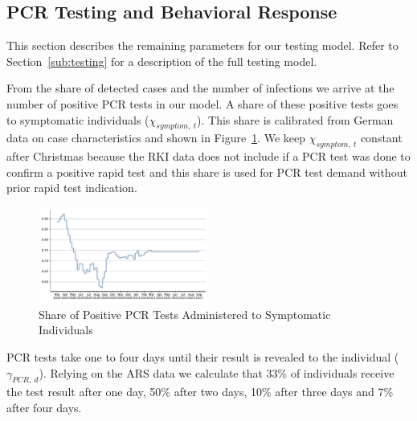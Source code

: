 \subsection{PCR Testing and Behavioral Response}
\label{subsec:pcr_testing_and_behavioral_response}


This section describes the remaining parameters for our testing model. Refer to
Section~\ref{sub:testing} for a description of the full testing model.

From the share of detected cases and the number of infections we arrive at the number of
positive PCR tests in our model. A share of these positive tests goes to symptomatic
individuals ($\chi_{symptom,\:t}$). This share is calibrated from German data on case
characteristics \citep{RKICaseCharacteristics} and shown in
Figure~\ref{fig:share_pcr_to_symptomatic}. We keep $\chi_{symptom,\:t}$ constant after
Christmas because the RKI data does not include if a PCR test was done to confirm a
positive rapid test and this share is used for PCR test demand without prior rapid test
indication.

\begin{figure}
    \centering
    \includegraphics[width=0.5\textwidth]{figures/results/figures/data/testing/used_share_of_pcr_tests_going_to_symptomatics}
    \caption{Share of Positive PCR Tests Administered to Symptomatic Individuals}
    \label{fig:share_pcr_to_symptomatic}
\end{figure}

PCR tests take one to four days until their result is revealed to the individual
($\gamma_{PCR,\:d}$). Relying on the ARS data \citep{ARS2020} we calculate that 33\% of
individuals receive the test result after one day, 50\% after two days, 10\% after three
days and 7\% after four days.

